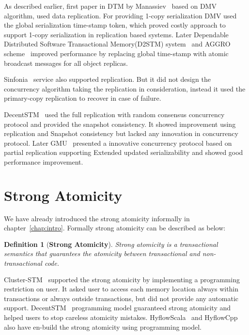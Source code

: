\documentclass[12pt,english]{report}
\newtheorem{definition}{Definition}[section]
\begin{document}
As described earlier, first paper in DTM by Manassiev~\cite{Manassiev:2006:EDV:1122971.1123002} based on DMV algorithm, used data replication. For providing 1-copy serialization DMV used the global serialization time-stamp token, which proved costly approach to support 1-copy serialization in replication based systems. Later Dependable Distributed Software Transactional Memory(D2STM) system~\cite{D2STM:5368778} and AGGRO scheme~\cite{AGGRO:5598236} improved performance by replacing global time-stamp with atomic broadcast messages for all object replicas.  

Sinfonia~\cite{Aguilera:2009:SNP:1629087.1629088} service also supported replication. But it did not design the concurrency algorithm taking the replication in consideration, instead it used the primary-copy replication to recover in case of failure. 

DecentSTM~\cite{DecentSTM:5470446} used the full replication with random consensus concurrency protocol and provided the  snapshot consistency. It showed improvement using replication and Snapshot consistency but lacked any innovation in concurrency protocol. Later GMU~\cite{GMU:peluso2012scalability} presented a innovative concurrency protocol based on partial replication supporting Extended updated serializability and showed good performance improvement. 

\section{Strong Atomicity}
We have already introduced the strong atomicity informally in chapter~\ref{chap:intro}. Formally strong atomicity can be described as below:

\begin{definition}[\textbf{Strong Atomicity}] 
Strong atomicity is a transactional semantics that guarantees the atomicity between transactional and non-transactional code.
\end{definition}

Cluster-STM~\cite{Bocchino:2008:STM:1345206.1345242} supported the strong atomicity by implementing a programming restriction on user. It asked user to access each memory location always within transactions or always outside transactions, but did not provide any automatic support. DecentSTM~\cite{DecentSTM:5470446} programming model guaranteed strong atomicity and helped users to stop careless atomicity mistakes. HyflowScala~\cite{turcuhyflow2} and HyflowCpp also have en-build the strong atomicity using programming model.
\end{document}
